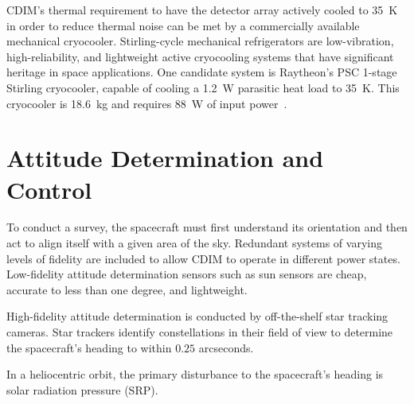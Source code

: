 \documentclass{ws-jai}
\begin{document}
CDIM's thermal requirement to have the detector array actively cooled to \SI{35}{\kelvin} in order to reduce thermal noise can be met by a commercially available mechanical cryocooler.
Stirling-cycle mechanical refrigerators are low-vibration, high-reliability, and lightweight active cryocooling systems that have significant heritage in space applications.
One candidate system is Raytheon's PSC 1-stage Stirling cryocooler, capable of cooling a \SI{1.2}{\watt} parasitic heat load to \SI{35}{\kelvin}.
This cryocooler is \SI{18.6}{\kilo\gram} and requires \SI{88}{\watt} of input power~\cite{tchandbook2003}.




\section{Attitude Determination and Control}
\label{sec:adcs}
To conduct a survey, the spacecraft must first understand its orientation and then act to align itself with a given area of the sky.
Redundant systems of varying levels of fidelity are included to allow CDIM to operate in different power states.
Low-fidelity attitude determination sensors such as sun sensors are cheap, accurate to less than one degree, and lightweight.

High-fidelity attitude determination is conducted by off-the-shelf star tracking cameras.
Star trackers identify constellations in their field of view to determine the spacecraft's heading to within $0.25$ arcseconds.

In a heliocentric orbit, the primary disturbance to the spacecraft's heading is solar radiation pressure (SRP).
\end{document}
